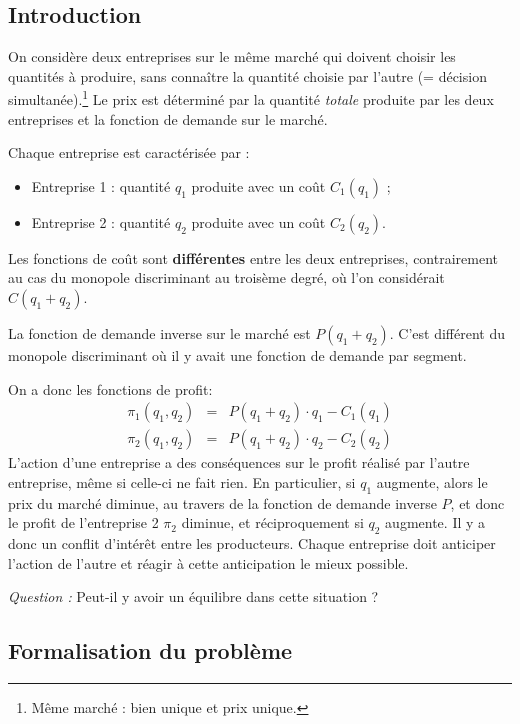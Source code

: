 \documentclass[
]{book}
\providecommand{\tightlist}{%
  \setlength{\itemsep}{0pt}\setlength{\parskip}{0pt}}
\theoremstyle{definition}
\theoremstyle{definition}
\theoremstyle{definition}
\theoremstyle{definition}
\theoremstyle{remark}
\begin{document}
\hypertarget{introduction-1}{%
\subsection{Introduction}\label{introduction-1}}

On considère deux entreprises sur le même marché qui doivent choisir les quantités à produire, sans connaître la quantité choisie par l'autre (= décision simultanée).\footnote{Même marché : bien unique et prix unique.}
Le prix est déterminé par la quantité \emph{totale} produite par les deux entreprises et la fonction de demande sur le marché.

Chaque entreprise est caractérisée par :

\begin{itemize}
\tightlist
\item
  Entreprise 1 : quantité \(q_1\) produite avec un coût \(C_1(q_1)\) ;
\item
  Entreprise 2 : quantité \(q_2\) produite avec un coût \(C_2(q_2)\).
\end{itemize}

Les fonctions de coût sont \textbf{différentes} entre les deux entreprises, contrairement au cas du monopole discriminant au troisème degré, où l'on considérait \(C(q_1+q_2)\).

La fonction de demande inverse sur le marché est \(P(q_1+q_2)\).
C'est différent du monopole discriminant où il y avait une fonction de demande par segment.

On a donc les fonctions de profit:
\[
\begin{array}{rcl}
\pi_1(q_1, q_2) &=& P(q_1+q_2)\cdot q_1-C_1(q_1)\\
\pi_2(q_1, q_2) &=& P(q_1+q_2)\cdot q_2-C_2(q_2)
\end{array}
\]
L'action d'une entreprise a des conséquences sur le profit réalisé par l'autre entreprise, même si celle-ci ne fait rien.
En particulier, si \(q_1\) augmente, alors le prix du marché diminue, au travers de la fonction de demande inverse \(P\), et donc le profit de l'entreprise 2 \(\pi_2\) diminue, et réciproquement si \(q_2\) augmente.
Il y a donc un conflit d'intérêt entre les producteurs.
Chaque entreprise doit anticiper l'action de l'autre et réagir à cette anticipation le mieux possible.

\emph{Question :} Peut-il y avoir un équilibre dans cette situation ?

\hypertarget{formalisation-du-probluxe8me}{%
\subsection{Formalisation du problème}\label{formalisation-du-probluxe8me}}
\end{document}
